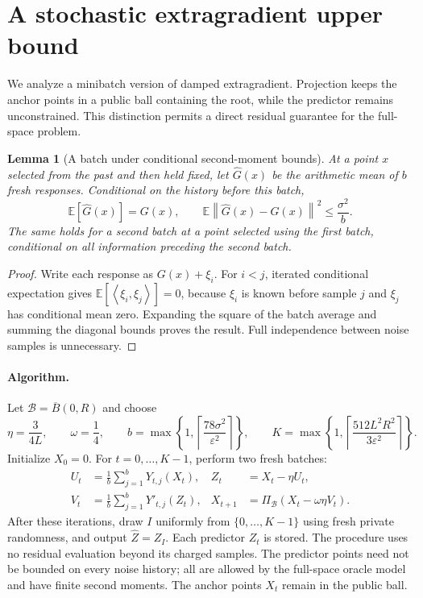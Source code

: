 \documentclass[11pt,a4paper]{article}
\newcommand{\E}{\mathbb E}
\newcommand{\eps}{\varepsilon}
\newcommand{\norm}[1]{\left\lVert #1\right\rVert}
\newcommand{\inner}[2]{\left\langle #1,#2\right\rangle}
\newtheorem{lemma}[theorem]{Lemma}
\theoremstyle{definition}
\theoremstyle{remark}
\begin{document}
\section{A stochastic extragradient upper bound}\label{sec:upper}
We analyze a minibatch version of damped extragradient. Projection keeps
the anchor points in a public ball containing the root, while the predictor
remains unconstrained. This distinction permits a direct residual guarantee
for the full-space problem.

\begin{lemma}[A batch under conditional second-moment bounds]\label{lem:batch}
At a point $x$ selected from the past and then held fixed, let $\widehat G(x)$ be the arithmetic mean of $b$ fresh responses. Conditional on the history before this batch,
\[
 \E[\widehat G(x)]=G(x),\qquad
 \E\norm{\widehat G(x)-G(x)}^2\le\frac{\sigma^2}{b}.
\]
The same holds for a second batch at a point selected using the first batch, conditional on all information preceding the second batch.
\end{lemma}
\begin{proof}
Write each response as $G(x)+\xi_i$. For $i<j$, iterated conditional expectation gives $\E[\inner{\xi_i}{\xi_j}]=0$, because $\xi_i$ is known before sample $j$ and $\xi_j$ has conditional mean zero. Expanding the square of the batch average and summing the diagonal bounds proves the result. Full independence between noise samples is unnecessary.
\end{proof}

\paragraph{Algorithm.}
Let $\mathcal B=\overline B(0,R)$ and choose
\begin{equation}\label{eq:upper-params}
 \eta=\frac{3}{4L},\qquad \omega=\frac14,\qquad
 b=\max\left\{1,\left\lceil\frac{78\sigma^2}{\eps^2}\right\rceil\right\},
 \qquad
 K=\max\left\{1,\left\lceil\frac{512L^2R^2}{3\eps^2}\right\rceil\right\}.
\end{equation}
Initialize $X_0=0$. For $t=0,\ldots,K-1$, perform two fresh batches:
\begin{align}
 U_t&=\frac1b\sum_{j=1}^b Y_{t,j}(X_t),
 &Z_t&=X_t-\eta U_t,\label{eq:predictor}\\
 V_t&=\frac1b\sum_{j=1}^b Y'_{t,j}(Z_t),
 &X_{t+1}&=\Pi_{\mathcal B}(X_t-\omega\eta V_t).
 \label{eq:corrector}
\end{align}
After these iterations, draw $I$ uniformly from $\{0,\ldots,K-1\}$ using fresh private randomness, and output $\widehat Z=Z_I$. Each predictor $Z_t$ is stored. The procedure uses no residual evaluation beyond its charged samples. The predictor points need not be bounded on every noise history; all are allowed by the full-space oracle model and have finite second moments. The anchor points $X_t$ remain in the public ball.
\end{document}
